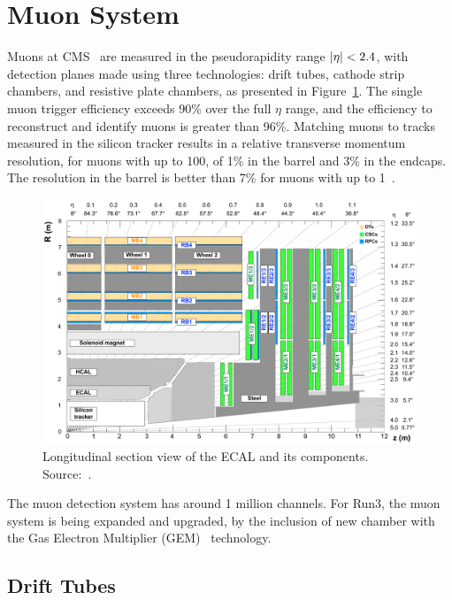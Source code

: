 
\section{Muon System}

Muons at CMS~\cite{muon_tdr} are measured in the pseudorapidity range $\lvert \eta \rvert < 2.4$, with detection planes made using three technologies: drift tubes, cathode strip chambers, and resistive plate chambers, as presented in Figure~\ref{cms_muon}. The single muon trigger efficiency exceeds 90\% over the full $\eta$ range, and the efficiency to reconstruct and identify muons is greater than 96\%. Matching muons to tracks measured in the silicon tracker results in a relative transverse momentum resolution, for muons with \pt up to 100\GeV, of 1\% in the barrel and 3\% in the endcaps. The \pt resolution in the barrel is better than 7\% for muons with \pt up to 1\TeV~\cite{Sirunyan:2018}. 

\begin{figure}[htbp]
    \centering
    \includegraphics[width=\textwidth]{figures_and_tables/experimental_setup/cms_muon.pdf}
    \caption{Longitudinal section view of the ECAL and its components. Source:~\cite{Chatrchyan:2013sba}.}
    \label{cms_muon}
\end{figure}

The muon detection system has around 1 million channels. For Run3, the muon system is being expanded and upgraded, by the inclusion of new chamber with the Gas Electron Multiplier (GEM)~\cite{Sauli:2262884} technology.

\subsection{Drift Tubes}

